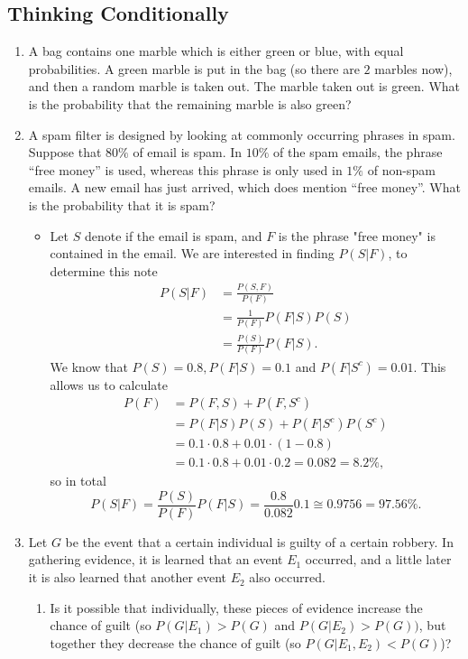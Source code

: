 \documentclass{article}
\begin{document}
\subsection{Thinking Conditionally}
\begin{enumerate}
	\item A bag contains one marble which is either green or blue, with equal probabilities. A green marble is put in the bag (so there are $2$ marbles now), and then a random marble is taken out. The marble taken out is green. What is the probability that the remaining marble is also green?
	\item A spam filter is designed by looking at commonly occurring phrases in spam. Suppose that $80\%$ of email is spam. In $10\%$ of the spam emails, the phrase “free money” is used, whereas this phrase is only used in $1\%$ of non-spam emails. A new email has just arrived, which does mention “free money”. What is the probability that it is spam?
		\begin{itemize}
			\item Let $S$ denote if the email is spam, and $F$ is the phrase "free money" is contained in the email. We are interested in finding $P(S|F)$, to determine this note
			$$
			\begin{aligned}
			P(S|F) &= \frac{P(S, F)}{P(F)} \\
			&= \frac{1}{P(F)} P(F|S)P(S) \\
			&= \frac{P(S)}{P(F)} P(F|S).
			\end{aligned}
			$$
			We know that $P(S) = 0.8, P(F|S) = 0.1$ and $P(F|S^c) = 0.01$. This allows us to calculate
			$$
			\begin{aligned}
			P(F) &= P(F, S) + P(F, S^c) \\
			&= P(F|S)P(S) + P(F|S^c)P(S^c) \\
			&= 0.1 \cdot 0.8 + 0.01 \cdot (1 - 0.8) \\
			&= 0.1 \cdot 0.8 + 0.01 \cdot 0.2 = 0.082 = 8.2\%,
			\end{aligned}
			$$
			so in total
			$$
			P(S|F) = \frac{P(S)}{P(F)} P(F|S) = \frac{0.8}{0.082} 0.1 \cong 0.9756 = 97.56\%.
			$$
		\end{itemize}
	\item Let $G$ be the event that a certain individual is guilty of a certain robbery. In gathering evidence, it is learned that an event $E_1$ occurred, and a little later it is also learned that another event $E_2$ also occurred.
		\begin{enumerate}
			\item Is it possible that individually, these pieces of evidence increase the chance of guilt (so $P(G|E_1) > P (G)$ and $P(G|E_2) > P (G))$, but together they decrease the chance of guilt (so $P(G|E_1, E_2) < P(G)$)?

\end{enumerate}
\end{enumerate}
\end{document}
